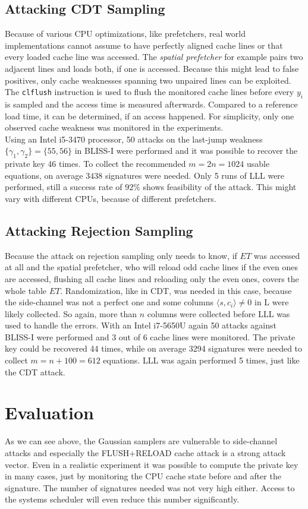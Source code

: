 \subsection{Attacking CDT Sampling}
Because of various CPU optimizations, like prefetchers, real world implementations cannot assume to have perfectly aligned cache lines or that every loaded cache line was accessed. The \textit{spatial prefetcher} for example pairs two adjacent lines and loads both, if one is accessed. Because this might lead to false positives, only cache weaknesses spanning two unpaired lines can be exploited. \\
The \verb|clflush| instruction is used to flush the monitored cache lines before every $y_i$ is sampled and the access time is measured afterwards. Compared to a reference load time, it can be determined, if an access happened. For simplicity, only one observed cache weakness was monitored in the experiments.\\
Using an Intel i5-3470 processor, 50 attacks on the last-jump weakness $\{\gamma_1, \gamma_2\} = \{55,56\}$ in BLISS-I were performed and it was possible to recover the private key 46 times. To collect the recommended $m = 2n = 1024$ usable equations, on average $3438$ signatures were needed. Only 5 runs of LLL were performed, still a success rate of $92\%$ shows feasibility of the attack. This might vary with different CPUs, because of different prefetchers.
\subsection{Attacking Rejection Sampling}
Because the attack on rejection sampling only needs to know, if $ET$ was accessed at all and the spatial prefetcher, who will reload odd cache lines if the even ones are accessed, flushing all cache lines and reloading only the even ones, covers the whole table $ET$. Randomization, like in CDT, was needed in this case, because the side-channel was not a perfect one and some columns $\langle s, c_i \rangle \neq 0$ in L were likely collected. So again, more than $n$ columns were collected before LLL was used to handle the errors. 
With an Intel i7-5650U again 50 attacks against BLISS-I were performed and 3 out of 6 cache lines were monitored. The private key could be recovered 44 times, while on average 3294 signatures were needed to collect $m = n +100 = 612$ equations. LLL was again performed 5 times, just like the CDT attack.
\section{Evaluation}
As we can see above, the Gaussian samplers are vulnerable to side-channel attacks and especially the FLUSH+RELOAD cache attack is a strong attack vector. Even in a realistic experiment it was possible to compute the private key in many cases, just by monitoring the CPU cache state before and after the signature. The number of signatures needed was not very high either. Access to the systems scheduler will even reduce this number significantly.

